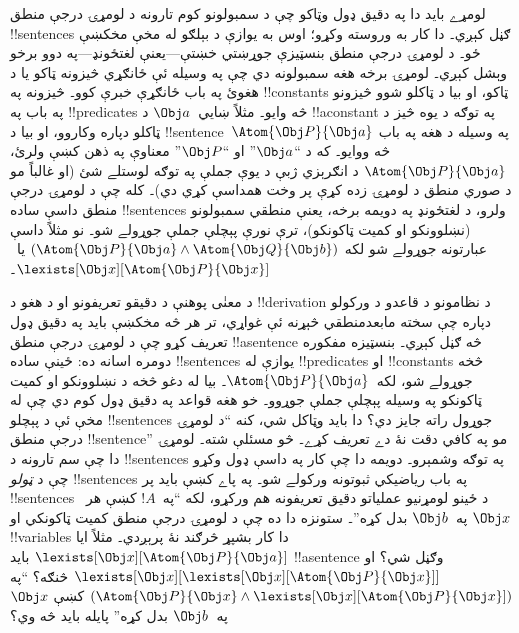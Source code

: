 \documentclass[../../../include/open-logic-section]{subfiles}
\begin{document}


لومړے بايد دا په دقيق ډول وټاکو چې د سمبولونو کوم تارونه د لومړۍ
درجې منطق !!{sentence}s ګڼل کېږي۔ دا کار به وروسته وکړو؛ اوس به
يوازې د بېلګو له مخې مخکښې ځو۔ د لومړۍ درجې منطق بنسټيزې جوړښتي
خښتې---يعنې لغتځونډ---په دوو برخو وېشل کېږي۔ لومړۍ برخه هغه
سمبولونه دي چې په وسيله ئې ځانګړي څيزونه ټاکو يا د هغوئ په باب
ځانګړې خبرې کوو۔ څيزونه په !!{constant}s ټاکو، او بيا د ټاکلو شوو
څيزونو په باب په !!{predicate}s څه وايو۔ مثلاً ښايي~$\Obj a$ د
!!a{constant} په توګه د يوه څيز د ټاکلو دپاره وکاروو، او بيا د
!!{sentence}~$\Atom{\Obj P}{\Obj a}$ په وسيله د هغه په باب څه
ووايو۔ که د ``$\Obj a$'' او ``$\Obj P$'' معناوې په ذهن کښې ولرئ،
$\Atom{\Obj P}{\Obj a}$ د انګرېزي ژبې د يوې جملې په توګه لوستلے
شئ (او غالباً مو د صوري منطق د لومړۍ زده کړې پر وخت همداسې کړي
دي)۔ کله چې د لومړۍ درجې منطق داسې ساده !!{sentence}s ولرو، د
لغتځونډ په دويمه برخه، يعنې منطقي سمبولونو (نښلوونکو او کميت
ټاکونکو)، ترې نورې پېچلې جملې جوړولے شو۔ نو مثلاً داسې عبارتونه
جوړولے شو لکه $(\Atom{\Obj P}{\Obj a} \land \Atom{\Obj Q}{\Obj b})$
يا~$\lexists[\Obj x][\Atom{\Obj P}{\Obj x}]$۔

د معنٰی پوهنې د دقيقو تعريفونو او د هغو د !!{derivation} د نظامونو
د قاعدو د ورکولو دپاره چې سخته مابعدمنطقي څېړنه ئې غواړي، تر هر څه
مخکښې بايد په دقيق ډول تعريف کړو چې د لومړۍ درجې منطق
!!a{sentence} څه ګڼل کېږي۔ بنسټيزه مفکوره دومره اسانه ده: ځينې ساده
!!{sentence}s يوازې له !!{predicate}s او !!{constant}s څخه جوړولے
شو، لکه~$\Atom{\Obj P}{\Obj a}$۔ بيا له دغو څخه د نښلوونکو او کميت
ټاکونکو په وسيله پېچلې جملې جوړوو۔ خو هغه قواعد په دقيق ډول کوم دي
چې له مخې ئې د پېچلو !!{sentence}s جوړول راته جايز دي؟ دا بايد
وټاکل شي، کنه ``د لومړۍ درجې منطق !!{sentence}'' مو په کافي دقت نۀ
دے تعريف کړے۔ څو مسئلې شته۔ لومړۍ دا چې سم تارونه د !!{sentence}s
په توګه وشمېرو۔ دويمه دا چې کار په داسې ډول وکړو چې د
\emph{ټولو} !!{sentence}s په باب رياضيکي ثبوتونه ورکولے شو۔ په پاے
کښې بايد پر !!{sentence}s د ځينو لومړنيو عملياتو دقيق تعريفونه هم
ورکړو، لکه ``په~$!A$ کښې هر~$\Obj x$ په~$\Obj b$ بدل کړه''۔ ستونزه
دا ده چې د لومړۍ درجې منطق کميت ټاکونکي او !!{variable}s دا کار
بشپړ څرګند نۀ پرېږدي۔ مثلاً ايا
$\lexists[\Obj x][\Atom{\Obj P}{\Obj a}]$ بايد !!a{sentence} وګڼل
شي؟ او $\lexists[\Obj x][\lexists[\Obj x][\Atom{\Obj P}{\Obj x}]]$
څنګه؟ ``په $(\Atom{\Obj P}{\Obj x} \land \lexists[\Obj x][\Atom{\Obj P}{\Obj x}])$
کښې $\Obj x$ په~$\Obj b$ بدل کړه'' پايله بايد څه وي؟
\end{document}
